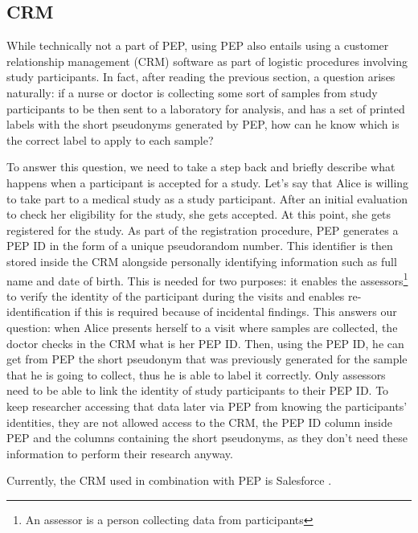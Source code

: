 \documentclass{report}
\begin{document}
\subsection{CRM}
While technically not a part of PEP, using PEP also entails using a customer relationship management (CRM) software as part of logistic procedures involving study participants. In fact, 
after reading the previous section, a question arises naturally: if a nurse or doctor is collecting some sort of samples from study participants to be then sent to a laboratory for 
analysis, and has a set of printed labels with the short pseudonyms generated by PEP, how can he know which is the correct label to apply to each sample? \par
To answer this question, we need to take a step back and briefly describe what happens when a participant is accepted for a study. Let's say that Alice is willing to take part to a
medical study as a study participant. After an initial evaluation to check her eligibility for the study, she gets accepted. At this point, she gets registered for the study. As
part of the registration procedure, PEP generates a PEP ID in the form of a unique pseudorandom number. This identifier is then stored inside the CRM alongside personally
identifying information such as full name and date of birth. This is needed for two purposes: it enables the assessors\footnote{An assessor is a person collecting data from
participants} to verify the identity of the participant during the visits and enables re-identification if this is required because of incidental findings. This answers our
question: when Alice presents herself to a visit where samples are collected, the doctor checks in the CRM what is her PEP ID. Then, using the PEP ID, he can get from PEP the short
pseudonym that was previously generated for the sample that he is going to collect, thus he is able to label it correctly. Only assessors need to be able to link the identity of
study participants to their PEP ID. To keep researcher accessing that data later via PEP from knowing the participants' identities, they are not allowed access to the CRM, the
PEP ID column inside PEP and the columns containing the short pseudonyms, as they don't need these information to perform their research anyway.\par
Currently, the CRM used in combination with PEP is Salesforce \cite{salesforce-website}.
\end{document}
